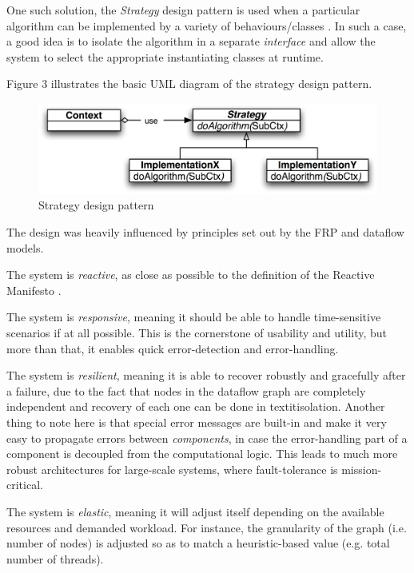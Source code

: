 \documentclass{dithesis}
\begin{document}
One such solution, the \textit{Strategy} design pattern is used when a particular algorithm can be implemented by a variety of behaviours/classes \cite{design}. In such a case, a good idea is to isolate the algorithm in a separate \textit{interface} and allow the system to select the appropriate instantiating classes at runtime.

Figure 3 illustrates the basic UML diagram of the strategy design pattern.

\begin{figure}[h!]
	\centering
	\includegraphics[scale=0.1]{strategy}
  	\caption{Strategy design pattern}
\end{figure}

The design was heavily influenced by principles set out by the FRP and dataflow models. 


The system is \textit{reactive}, as close as possible to the definition of the Reactive Manifesto \cite{manifesto}. 

The system is \textit{responsive}, meaning it should be able to handle time-sensitive scenarios if at all possible. This is the cornerstone of usability and utility, but more than that, it enables quick error-detection and error-handling.

The system is \textit{resilient}, meaning it is able to recover robustly and gracefully after a failure, due to the fact that nodes in the dataflow graph are completely independent and recovery of each one can be done in textit{isolation}. Another thing to note here is that special error messages are built-in and make it very easy to propagate errors between \textit{components}, in case the error-handling part of a component is decoupled from the computational logic. This leads to much more robust architectures for large-scale systems, where fault-tolerance is mission-critical.

The system is \textit{elastic}, meaning it will adjust itself depending on the available resources and demanded workload. For instance, the granularity of the graph (i.e. number of nodes) is adjusted so as to match a heuristic-based value (e.g. total number of threads).
\end{document}
